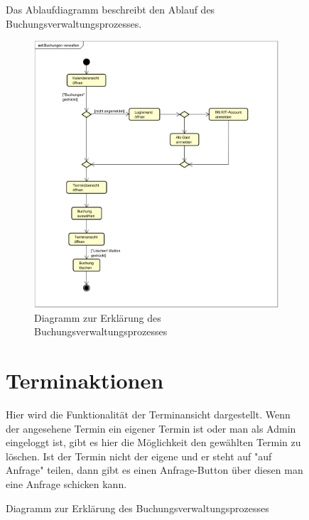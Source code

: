 \begin{figure}[ht]
Das Ablaufdiagramm beschreibt den Ablauf des Buchungsverwaltungsprozesses.

\begin{figure}[ht]
    \centering
    \includegraphics[width=\textwidth]{figures/activity/buchungverwalten}
    \caption{Diagramm zur Erklärung des Buchungsverwaltungsprozesses}
    \label{fig:manage-booking-diagram}
\end{figure}
\clearpage

\section{Terminaktionen}

Hier wird die Funktionalität der Terminansicht dargestellt. Wenn der angesehene Termin ein eigener Termin ist
oder man als Admin eingeloggt ist, gibt es hier die Möglichkeit den gewählten Termin zu löschen. Ist der
Termin nicht der eigene und er steht auf "auf Anfrage" teilen, dann gibt es einen Anfrage-Button über diesen man
eine Anfrage schicken kann.


\end{figure}
